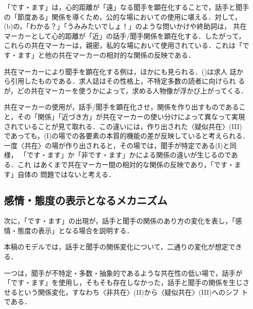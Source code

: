 \documentclass[japanese]{jnlp_1.3c}
\begin{document}
「です・ます」は，心的距離が「遠」なる聞手を顕在化することで，話手と聞手
の「節度ある」関係を導くため，公的な場においての使用に堪える．対して，
(b)の，「わかる？」「うみみたいでしょ！」のような問いかけや終助詞は，
共在マーカーとして心的距離が「近」の話手/聞手関係を顕在化する．したがって，
これらの共在マーカーは，親密，私的な場において使用されている．これは「で
す・ます」と他の共在マーカーの相対的な関係の反映である．

共在マーカーにより聞手を顕在化する例は，ほかにも見られる．()は求人
誌から引用したものである．求人誌はその性格上，不特定多数の読者に向けられ
るが，どの共在マーカーを使うかによって，求める人物像が浮かび上がってくる．


共在マーカーの使用が，話手/聞手を顕在化させ，関係を作り出すものであるこ
と，その「関係」「近づき方」が共在マーカーの使い分けによって異なって実現
されていることが見て取れる．この違いには，作り出された〈疑似共在〉(III)
であっても，(I)の場での各要素の本質的機能の差が反映していると考えられる．
一度〈共在〉の場が作り出されると，その場では，聞手が特定である(I)と同様，
「です・ます」か「非です・ます」かによる関係の違いが生じるのである．これ
はあくまで共在マーカー間の相対的な関係の反映であり，「です・ます」自体の
問題ではないと考える．

\subsection{感情・態度の表示となるメカニズム}

次に，「です・ます」の出現が，話手と聞手の関係のあり方の変化を表し，「感
情・態度の表示」となる場合を説明する．

本稿のモデルでは，話手と聞手の関係変化について，二通りの変化が想定できる．

一つは，聞手が不特定・多数・抽象的であるような共在性の低い場で，話手が
「です・ます」を使用し，そもそも存在しなかった，話手と聞手の関係を生じさ
せるという関係変化，すなわち〈非共在〉(II)から〈疑似共在〉(III)へのシフ
トである．
\end{document}
